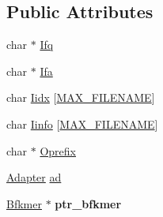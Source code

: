 \subsection*{Public Attributes}
\begin{DoxyCompactItemize}
\item 
char $\ast$ \hyperlink{struct__iparam__trimFilter_a5147310738277c148ca7109ba77829ca}{Ifq}
\item 
char $\ast$ \hyperlink{struct__iparam__trimFilter_a55796cd412ef4ca61a5a799d2f64beec}{Ifa}
\item 
char \hyperlink{struct__iparam__trimFilter_ae0e1c22a522a0f014952d204e8887607}{Iidx} \mbox{[}\hyperlink{defines_8h_abe0ec333b60117063f9b9fd9f849cb08}{M\+A\+X\+\_\+\+F\+I\+L\+E\+N\+A\+M\+E}\mbox{]}
\item 
char \hyperlink{struct__iparam__trimFilter_a76e905e2a809d9a659d49fbd388e0c32}{Iinfo} \mbox{[}\hyperlink{defines_8h_abe0ec333b60117063f9b9fd9f849cb08}{M\+A\+X\+\_\+\+F\+I\+L\+E\+N\+A\+M\+E}\mbox{]}
\item 
char $\ast$ \hyperlink{struct__iparam__trimFilter_ad24f2902b532a4ff2dfb1122941064b8}{Oprefix}
\item 
\hyperlink{init__trimFilter_8h_a3442d07a10a4ab75064687f3c244e370}{Adapter} \hyperlink{struct__iparam__trimFilter_aba4b2762da9029d272905c558986b3f7}{ad}
\item 
\hypertarget{struct__iparam__trimFilter_a63b9b54ab69ce2602ec37ececc59e131}{\hyperlink{bloom_8h_a4bf3f34a321ce545e533d29ce363f569}{Bfkmer} $\ast$ {\bfseries ptr\+\_\+bfkmer}}\label{struct__iparam__trimFilter_a63b9b54ab69ce2602ec37ececc59e131}


\end{DoxyCompactItemize}
